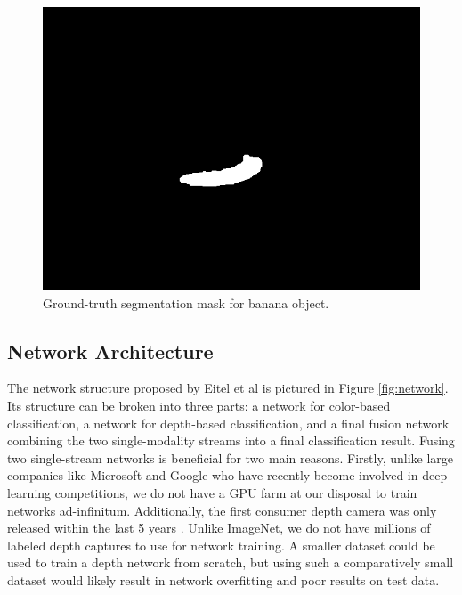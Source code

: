 \begin{figure}
	\centering
	\includegraphics[width=0.5\linewidth]{img/banana_1_1_1_mask.png}
	\caption{Ground-truth segmentation mask for banana object.}
	\label{fig:img_mask}
\end{figure}

\subsection{Network Architecture}
The network structure proposed by Eitel et al \cite{Eitel2015} is pictured in Figure \ref{fig:network}. Its structure can be broken into three parts: a network for color-based classification, a network for depth-based classification, and a final fusion network combining the two single-modality streams into a final classification result. Fusing two single-stream networks is beneficial for two main reasons. Firstly, unlike large companies like Microsoft and Google who have recently become involved in deep learning competitions, we do not have a GPU farm at our disposal to train networks ad-infinitum. Additionally, the first consumer depth camera was only released within the last 5 years \cite{Alex2009_kinect}. Unlike ImageNet, we do not have millions of labeled depth captures to use for network training. A smaller dataset could be used to train a depth network from scratch, but using such a comparatively small dataset would likely result in network overfitting and poor results on test data.

